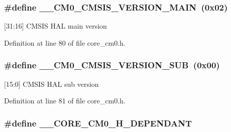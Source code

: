 \subsubsection[{\texorpdfstring{\+\_\+\+\_\+\+C\+M0\+\_\+\+C\+M\+S\+I\+S\+\_\+\+V\+E\+R\+S\+I\+O\+N\+\_\+\+M\+A\+IN}{__CM0_CMSIS_VERSION_MAIN}}]{\setlength{\rightskip}{0pt plus 5cm}\#define \+\_\+\+\_\+\+C\+M0\+\_\+\+C\+M\+S\+I\+S\+\_\+\+V\+E\+R\+S\+I\+O\+N\+\_\+\+M\+A\+IN~(0x02)}\hypertarget{group___c_m_s_i_s__core__definitions_gacd01bf0a654a7f15f606593aa636bc72}{}\label{group___c_m_s_i_s__core__definitions_gacd01bf0a654a7f15f606593aa636bc72}
\mbox{[}31\+:16\mbox{]} C\+M\+S\+IS H\+AL main version 

Definition at line 80 of file core\+\_\+cm0.\+h.

\subsubsection[{\texorpdfstring{\+\_\+\+\_\+\+C\+M0\+\_\+\+C\+M\+S\+I\+S\+\_\+\+V\+E\+R\+S\+I\+O\+N\+\_\+\+S\+UB}{__CM0_CMSIS_VERSION_SUB}}]{\setlength{\rightskip}{0pt plus 5cm}\#define \+\_\+\+\_\+\+C\+M0\+\_\+\+C\+M\+S\+I\+S\+\_\+\+V\+E\+R\+S\+I\+O\+N\+\_\+\+S\+UB~(0x00)}\hypertarget{group___c_m_s_i_s__core__definitions_gab6a85b0d3b2fbcfb62003006ece175cc}{}\label{group___c_m_s_i_s__core__definitions_gab6a85b0d3b2fbcfb62003006ece175cc}
\mbox{[}15\+:0\mbox{]} C\+M\+S\+IS H\+AL sub version 

Definition at line 81 of file core\+\_\+cm0.\+h.

\subsubsection[{\texorpdfstring{\+\_\+\+\_\+\+C\+O\+R\+E\+\_\+\+C\+M0\+\_\+\+H\+\_\+\+D\+E\+P\+E\+N\+D\+A\+NT}{__CORE_CM0_H_DEPENDANT}}]{\setlength{\rightskip}{0pt plus 5cm}\#define \+\_\+\+\_\+\+C\+O\+R\+E\+\_\+\+C\+M0\+\_\+\+H\+\_\+\+D\+E\+P\+E\+N\+D\+A\+NT}\hypertarget{group___c_m_s_i_s__core__definitions_gac1e2acb34ba7f2543bcb2249bead4aee}{}\label{group___c_m_s_i_s__core__definitions_gac1e2acb34ba7f2543bcb2249bead4aee}


